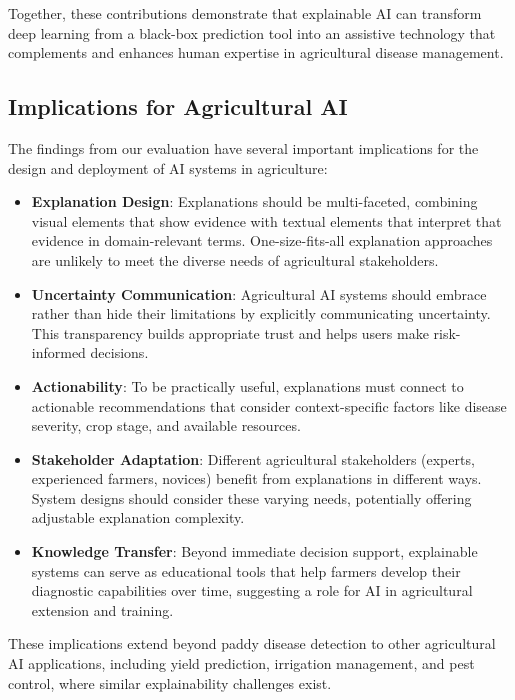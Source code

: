 Together, these contributions demonstrate that explainable AI can transform deep learning from a black-box prediction tool into an assistive technology that complements and enhances human expertise in agricultural disease management.

\subsection{Implications for Agricultural AI}

The findings from our evaluation have several important implications for the design and deployment of AI systems in agriculture:

\begin{itemize}
    \item \textbf{Explanation Design}: Explanations should be multi-faceted, combining visual elements that show evidence with textual elements that interpret that evidence in domain-relevant terms. One-size-fits-all explanation approaches are unlikely to meet the diverse needs of agricultural stakeholders.
    
    \item \textbf{Uncertainty Communication}: Agricultural AI systems should embrace rather than hide their limitations by explicitly communicating uncertainty. This transparency builds appropriate trust and helps users make risk-informed decisions.
    
    \item \textbf{Actionability}: To be practically useful, explanations must connect to actionable recommendations that consider context-specific factors like disease severity, crop stage, and available resources.
    
    \item \textbf{Stakeholder Adaptation}: Different agricultural stakeholders (experts, experienced farmers, novices) benefit from explanations in different ways. System designs should consider these varying needs, potentially offering adjustable explanation complexity.
    
    \item \textbf{Knowledge Transfer}: Beyond immediate decision support, explainable systems can serve as educational tools that help farmers develop their diagnostic capabilities over time, suggesting a role for AI in agricultural extension and training.
\end{itemize}

These implications extend beyond paddy disease detection to other agricultural AI applications, including yield prediction, irrigation management, and pest control, where similar explainability challenges exist.

